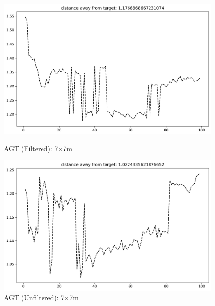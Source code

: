 \documentclass[runningheads]{llncs}
\begin{document}
\begin{figure}[H]
	\centering
	\begin{minipage}{0.49\textwidth}
		\centering
		\includegraphics[width=\textwidth]{figures/filtered/knn_custom_7.png}
		\caption*{AGT (Filtered): 7×7m}
	\end{minipage}
	\hfill
	\begin{minipage}{0.49\textwidth}
		\centering
		\includegraphics[width=\textwidth]{figures/unfiltered/knn_custom_7.png}
		\caption*{AGT (Unfiltered): 7×7m}
	\end{minipage}
\end{figure}
\end{document}
